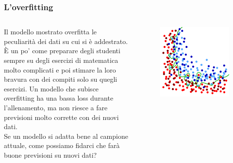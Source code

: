 \begin{frame}

	\frametitle{L'overfitting}

	\begin{columns}
			Il modello mostrato overfitta le peculiarità dei dati su cui si è addestrato.\\
			È un po' come preparare degli studenti sempre su degli esercizi di matematica molto complicati e poi stimare la loro bravura con dei compiti solo su quegli esercizi.
			\newlinedouble
			Un modello che subisce overfitting ha una bassa loss durante l'allenamento, ma non riesce a fare previsioni molto corrette con dei nuovi dati.\\
			Se un modello si adatta bene al campione attuale, come possiamo fidarci che farà buone previsioni su nuovi dati?

			\begin{figure}[!htbp]
				\centering
				\includegraphics[width=1.0\linewidth]{images/supervised/validation_test_training_peril_of_overfitting/overfitting_green_line_with_test.pdf}
			\end{figure}

	\end{columns}
\end{frame}


